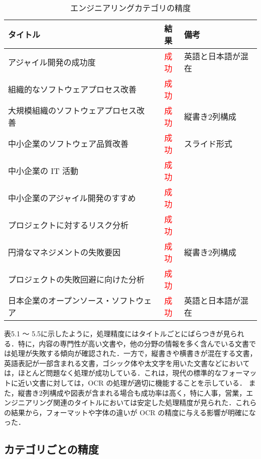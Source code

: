 \begin{table}[!htbp]
  \label{tab:doc_engineer}
  \caption{エンジニアリングカテゴリの精度}
  \begin{center}
  \begin{tabular}{|l|c|l|}
    \hline
    \textbf{タイトル} & \textbf{結果} & \textbf{備考} \\ \hline
    アジャイル開発の成功度 & \textcolor{red}{成功} & 英語と日本語が混在 \\ \hline
    組織的なソフトウェアプロセス改善 & \textcolor{red}{成功} &  \\ \hline
    大規模組織のソフトウェアプロセス改善 & \textcolor{red}{成功} & 縦書き2列構成 \\ \hline
    中小企業のソフトウェア品質改善 & \textcolor{red}{成功} & スライド形式 \\ \hline
    中小企業の IT 活動 & \textcolor{red}{成功} & \\ \hline
    中小企業のアジャイル開発のすすめ & \textcolor{red}{成功} & \\ \hline
    プロジェクトに対するリスク分析 & \textcolor{red}{成功} & \\ \hline
    円滑なマネジメントの失敗要因 & \textcolor{red}{成功} & 縦書き2列構成 \\ \hline
    プロジェクトの失敗回避に向けた分析 & \textcolor{red}{成功} & \\ \hline
    日本企業のオープンソース・ソフトウェア & \textcolor{red}{成功} & 英語と日本語が混在 \\ \hline
  \end{tabular}
  \end{center}
\end{table}

表5.1 ～ 5.5に示したように，処理精度にはタイトルごとにばらつきが見られる．特に，内容の専門性が高い文書や，他の分野の情報を多く含んでいる文書では処理が失敗する傾向が確認された．一方で，縦書きや横書きが混在する文書，英語表記が一部含まれる文書，ゴシック体や太文字を用いた文書などにおいては，ほとんど問題なく処理が成功している．これは，現代の標準的なフォーマットに近い文書に対しては，OCR の処理が適切に機能することを示している．
また，縦書き2列構成や図表が含まれる場合も成功率は高く，特に人事，営業，エンジニアリング関連のタイトルにおいては安定した処理精度が見られた．これらの結果から，フォーマットや字体の違いが OCR の精度に与える影響が明確になった．

\subsection{カテゴリごとの精度}
\label{subsec:category}

